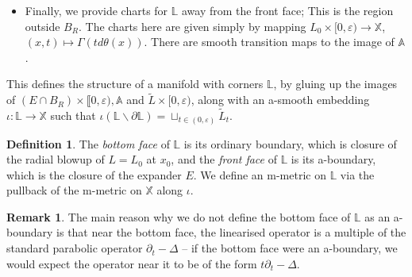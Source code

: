 \documentclass[10pt, a4paper]{article}
\theoremstyle{plain}%
\newtheorem{lem}[theorem]{Lemma}
\theoremstyle{definition}
\newtheorem{defn}[theorem]{Definition}
\newtheorem{rem}[theorem]{Remark}
\numberwithin{figure}{section}
\numberwithin{equation}{section}
\newcommand{\bL}{\mathbb{L}}
\newcommand{\bX}{\mathbb{X}}
\newcommand{\bA}{\mathbb{A}}
\newcommand{\bB}{\mathbb{B}}
\newcommand{\pa}{\partial}
\newcommand{\rt}{\rightarrow}
\newcommand{\ep}{\varepsilon}
\newcommand{\tU}{\widetilde{\Upsilon}}
\newcommand{\tPhi}{\widetilde{\Phi}}
\begin{document}
\begin{itemize}
	 Now, by the following Lemma, it follows that $\Upsilon_t^{-1}(\tilde{L}_t)$ near the corner, given by the embedding of $\Gamma(r^{-2}d_\mathrm{rel}f)$ under $\tPhi_c\circ r^2$, is an a-smooth embedded submanifold in $\bB$. 
    \begin{lem}
        The relative $1$-form $r^{-2}d_\mathrm{rel}f$ extends to an a-smooth  section of $^bT^*_\mathrm{rel}\bA$, if $r^{-2}f$ is an a-smooth function on $\bA$.
    \end{lem}
    \begin{proof}
        This follows since $d_\mathrm{rel}(r^{-2}) = O(r^{-2})$, as can be seen by computing in local coordinates.
    \end{proof}
    Therefore, the embeddings $\Upsilon_t^{-1}(\widetilde{L}_t)$ near the corner compactify to an a-smooth embedding $\bA\rt\bB$. Since this overlaps with the scaled expander near the front face as considered in the previous point, we will get a gluing between $\mathbb{A}$ and $(E_0\cap B_R)\times \llbracket 0,\ep)$, which is a-smooth. Composing this with $\tU$ gives us the a-smooth embedding of $\bL$ in a neighbourhood of the front face in $\bX$. 
    
    
	\item Finally, we provide charts for $\mathbb{L}$ away from the front face; This is the region outside $B_{R}$. The charts here are given simply by mapping $L_0\times[0,\ep)\rt \bX$, $(x,t)\mapsto \Gamma(td\theta(x))$. There are smooth transition maps to the image of $\mathbb{A}$.
\end{itemize}
This defines the structure of a manifold with corners $\mathbb{L}$, by gluing up the images of $(E\cap B_R)\times\llbracket0,\ep), \bA$ and $\tilde{L}\times[0,\ep)$, along with an a-smooth embedding $\iota: \mathbb{L}\rightarrow \mathbb{X}$ such that $\iota(\mathbb{L}\backslash \partial\mathbb{L}) = \sqcup_{t\in(0,\varepsilon)}\widetilde{L}_t$. 

\begin{defn}
    The \textit{bottom face} of $\bL$ is its ordinary boundary, which is closure of the radial blowup of $L= L_0$ at $x_0$, and the \textit{front face} of $\bL$ is its a-boundary, which is the closure of the expander $E$. We define an m-metric on $\bL$ via the pullback of the m-metric on $\mathbb{X}$ along $\iota$.
\end{defn}
\begin{rem} The main reason why we do not define the bottom face of $\bL$ as an a-boundary is that near the bottom face, the linearised operator is a multiple of the standard parabolic operator $\pa_t-\Delta$ -- if the bottom face were an a-boundary, we would expect the operator near it to be of the form $t\pa_t-\Delta$.
\end{rem}
\end{document}
